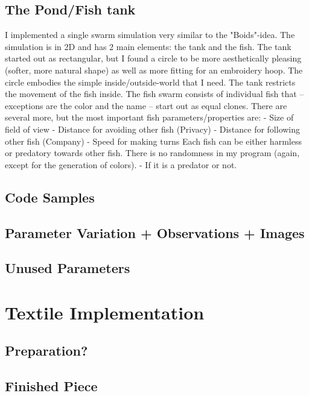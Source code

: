 \documentclass{scrartcl}
\begin{document}
\subsection{The Pond/Fish tank}

I implemented a single swarm simulation very similar to the "Boids"-idea.
The simulation is in 2D and has 2 main elements: the tank and the fish.
The tank started out as rectangular, but I found a circle to be more aesthetically pleasing (softer, more natural shape) as well as more fitting for an embroidery hoop. The circle embodies the simple inside/outside-world that I need. The tank restricts the movement of the fish inside.
The fish swarm consists of individual fish that – exceptions are the color and the name – start out as equal clones. There are several more, but the most important fish parameters/properties are:
-	Size of field of view
-	Distance for avoiding other fish (Privacy)
-	Distance for following other fish (Company)
-	Speed for making turns
Each fish can be either harmless or predatory towards other fish.
There is no randomness in my program (again, except for the generation of colors).
-	If it is a predator or not.

\subsection{Code Samples}

\subsection{Parameter Variation + Observations + Images}

\subsection{Unused Parameters}


\section{Textile Implementation}

\subsection{Preparation?}
\subsection{}
\subsection{Finished Piece}
\end{document}
